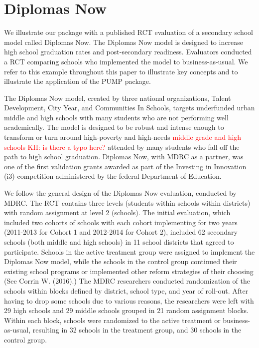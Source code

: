 \documentclass[
]{article}
\begin{document}
\section{Diplomas Now}
\label{sec:diplomas}

We illustrate our package with a published RCT evaluation of a secondary
school model called Diplomas Now. The Diplomas Now model is designed to
increase high school graduation rates and post-secondary readiness.
Evaluators conducted a RCT comparing schools who implemented the model
to business-as-usual. We refer to this example throughout this paper to
illustrate key concepts and to illustrate the application of the PUMP
package.

The Diplomas Now model, created by three national organizations, Talent
Development, City Year, and Communities In Schools, targets underfunded
urban middle and high schools with many students who are not performing
well academically. The model is designed to be robust and intense enough
to transform or turn around high-poverty and high-needs
\textcolor{red}{middle grade and high schools KH: is there a typo here?}
attended by many students who fall off the path to high school
graduation. Diplomas Now, with MDRC as a partner, was one of the first
validation grants awarded as part of the Investing in Innovation (i3)
competition administered by the federal Department of Education.

We follow the general design of the Diplomas Now evaluation, conducted
by MDRC. The RCT contains three levels (students within schools within
districts) with random assignment at level 2 (schools). The initial
evaluation, which included two cohorts of schools with each cohort
implementing for two years (2011-2013 for Cohort 1 and 2012-2014 for
Cohort 2), included 62 secondary schools (both middle and high schools)
in 11 school districts that agreed to participate. Schools in the active
treatment group were assigned to implement the Diplomas Now model, while
the schools in the control group continued their existing school
programs or implemented other reform strategies of their choosing (See
Corrin W. (2016).) The MDRC researchers conducted randomization of the
schools within blocks defined by district, school type, and year of
roll-out. After having to drop some schools due to various reasons, the
researchers were left with 29 high schools and 29 middle schools grouped
in 21 random assignment blocks. Within each block, schools were
randomized to the active treatment or business-as-usual, resulting in 32
schools in the treatment group, and 30 schools in the control group.
\end{document}

